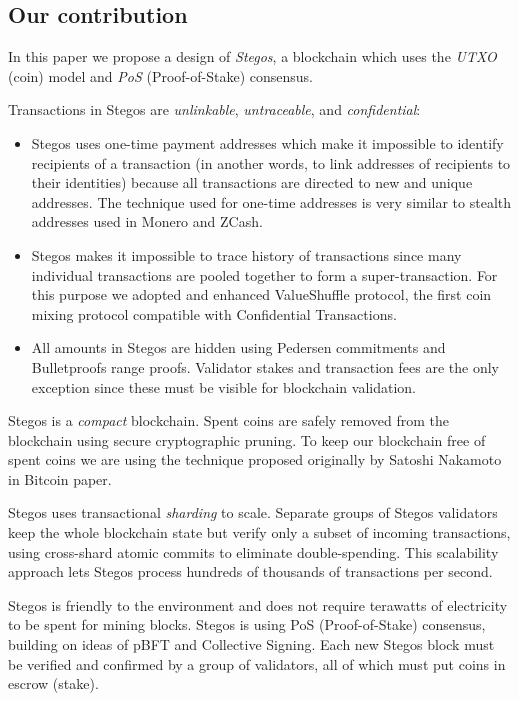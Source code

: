 \documentclass[a4paper, 10pt, conference]{ieeeconf}
\begin{document}
\subsection{Our contribution}

In this paper we propose a design of \textit{Stegos}, a blockchain which uses the \textit{UTXO} (coin) model and \textit{PoS} (Proof-of-Stake) consensus.

Transactions in Stegos are \textit{unlinkable}, \textit{untraceable}, and \textit{confidential}:

\begin{itemize}

\item{Stegos uses one-time payment addresses which make it impossible to identify recipients of a transaction (in another words, to link addresses of recipients to their identities) because all transactions are directed to new and unique addresses. The technique used for one-time addresses is very similar to stealth addresses used in Monero and ZCash.}

\item{Stegos makes it impossible to trace history of transactions since many individual transactions are pooled together to form a super-transaction. For this purpose we adopted and enhanced ValueShuffle protocol\cite{c7}, the first coin mixing protocol compatible with Confidential Transactions.}

\item{All amounts in Stegos are hidden using Pedersen commitments\cite{c8} and Bulletproofs range proofs\cite{c4}. Validator stakes and transaction fees are the only exception since these must be visible for blockchain validation.}

\end{itemize}

Stegos is a \textit{compact} blockchain. Spent coins are safely removed from the blockchain using secure cryptographic pruning. To keep our blockchain free of spent coins we are using the technique proposed originally by Satoshi Nakamoto in Bitcoin paper\cite{c1}.

Stegos uses transactional \textit{sharding} to scale. Separate gro\-ups of Stegos validators keep the whole blockchain state but verify only a subset of incoming transactions, using cross-shard atomic commits to eliminate double-spending. This scalability approach lets Stegos process hundreds of thousands of transactions per second.

Stegos is friendly to the environment and does not require terawatts of electricity to be spent for mining blocks. Stegos is using PoS (Proof-of-Stake) consensus, building on ideas of pBFT\cite{c9} and Collective Signing\cite{c10}\cite{c11}. Each new Stegos block must be verified and confirmed by a group of validators, all of which must put coins in escrow (stake).
\end{document}
